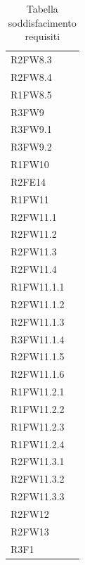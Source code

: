 \begin{table}[H]
\begin{tabular}[t]{ m{}<{\centering}  m{}<{\centering} }
	R2FW8.3 & \Ns \\	
	 
	R2FW8.4 & \Ns \\	 
	 
	R1FW8.5 & \Ns \\	 
	 
	R3FW9 & \Ns \\	
	 
	R3FW9.1& \Ns \\	 
	 
	R3FW9.2& \Ns \\	  
	 
	R1FW10 & \So \\	 
	 
	R2FE14& \So \\	 
	 	 
	R1FW11& \So \\	 	
	
	R2FW11.1 & \So \\
 	
	R2FW11.2 & \So \\
 	
	R2FW11.3 & \So \\
 
	R2FW11.4 & \Ns \\
	
	R1FW11.1.1 & \So \\
		
	R2FW11.1.2 & \So \\
		
	R2FW11.1.3 & \So \\
	
	R3FW11.1.4& \Ns \\
	
	R2FW11.1.5& \Ns \\
	
	R2FW11.1.6 & \So \\
	
	R1FW11.2.1 & \So \\

	R1FW11.2.2 & \So \\	
	
	R1FW11.2.3 & \So \\
	
	R1FW11.2.4 & \So \\
	
	R2FW11.3.1 & \So \\
	
	R2FW11.3.2 & \So \\
	
	R2FW11.3.3 & \So \\

	R2FW12& \Ns \\

	R2FW13 & \Ns \\

	R3F1 & \Ns \\


\end{tabular}
\caption{Tabella soddisfacimento requisiti}
\end{table}

